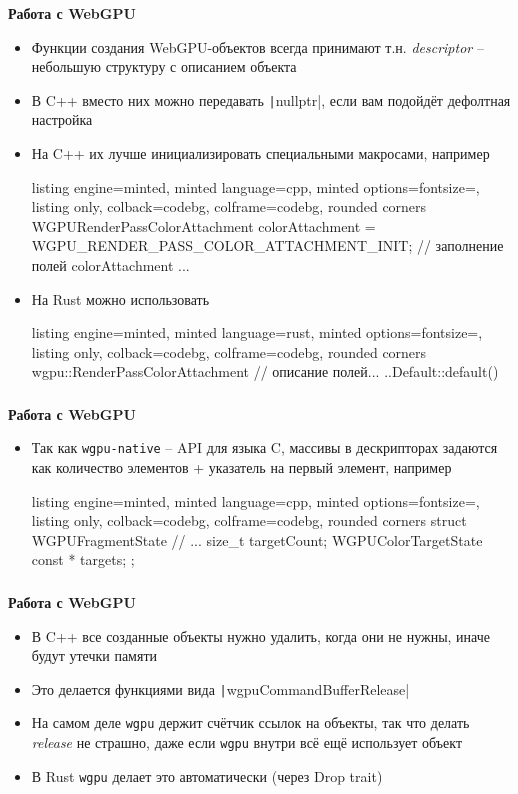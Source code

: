 \documentclass[10pt]{beamer}
\begin{document}
\begin{frame}[fragile]
\frametitle{}
\textbf{Работа с WebGPU}
\begin{itemize}
\item Функции создания WebGPU-объектов всегда принимают т.н. \textit{descriptor} -- небольшую структуру с описанием объекта
\item В C++ вместо них можно передавать \texttt|nullptr|, если вам подойдёт дефолтная настройка
\item На C++ их лучше инициализировать специальными макросами, например
\begin{tcblisting}{listing engine=minted, minted language=cpp, minted options={fontsize=\scriptsize}, listing only, colback=codebg, colframe=codebg, rounded corners}
WGPURenderPassColorAttachment colorAttachment =
    WGPU_RENDER_PASS_COLOR_ATTACHMENT_INIT;
// заполнение полей colorAttachment ...
\end{tcblisting}
\item На Rust можно использовать
\begin{tcblisting}{listing engine=minted, minted language=rust, minted options={fontsize=\scriptsize}, listing only, colback=codebg, colframe=codebg, rounded corners}
wgpu::RenderPassColorAttachment {
    // описание полей...
    ..Default::default()
}
\end{tcblisting}
\end{itemize}
\end{frame}

\begin{frame}[fragile]
\frametitle{}
\textbf{Работа с WebGPU}
\begin{itemize}
\item Так как \nolinkurl{wgpu-native} -- API для языка C, массивы в дескрипторах задаются как количество элементов + указатель на первый элемент, например
\begin{tcblisting}{listing engine=minted, minted language=cpp, minted options={fontsize=\scriptsize}, listing only, colback=codebg, colframe=codebg, rounded corners}
struct WGPUFragmentState {
    // ...
    size_t targetCount;
    WGPUColorTargetState const * targets;
};
\end{tcblisting}
\end{itemize}
\end{frame}

\begin{frame}[fragile]
\frametitle{}
\textbf{Работа с WebGPU}
\begin{itemize}
\item В C++ все созданные объекты нужно удалить, когда они не нужны, иначе будут утечки памяти
\pause
\item Это делается функциями вида \texttt|wgpuCommandBufferRelease|
\pause
\item На самом деле \nolinkurl{wgpu} держит счётчик ссылок на объекты, так что делать \textit{release} не страшно, даже если \nolinkurl{wgpu} внутри всё ещё использует объект
\pause
\item В Rust \nolinkurl{wgpu} делает это автоматически (через Drop trait)
\end{itemize}
\end{frame}
\end{document}
